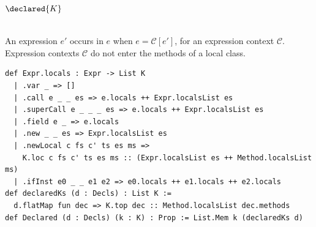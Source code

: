 \begin{cmp}{$\declared{K}$}
\begin{paperside}
\\[1ex]
An expression $e'$ occurs in $e$ when $e=\mathcal{C}[e']$, for an expression context $\mathcal{C}$.
Expression contexts $\mathcal{C}$ do not enter the methods of a local class.
\end{paperside}
\begin{leanside}
\begin{lstlisting}[style=leanside]
def Expr.locals : Expr -> List K
  | .var _ => []
  | .call e _ _ es => e.locals ++ Expr.localsList es
  | .superCall e _ _ _ es => e.locals ++ Expr.localsList es
  | .field e _ => e.locals
  | .new _ _ es => Expr.localsList es
  | .newLocal c fs c' ts es ms =>
    K.loc c fs c' ts es ms :: (Expr.localsList es ++ Method.localsList ms)
  | .ifInst e0 _ _ e1 e2 => e0.locals ++ e1.locals ++ e2.locals
def declaredKs (d : Decls) : List K :=
  d.flatMap fun dec => K.top dec :: Method.localsList dec.methods
def Declared (d : Decls) (k : K) : Prop := List.Mem k (declaredKs d)
\end{lstlisting}
\end{leanside}
\end{cmp}

